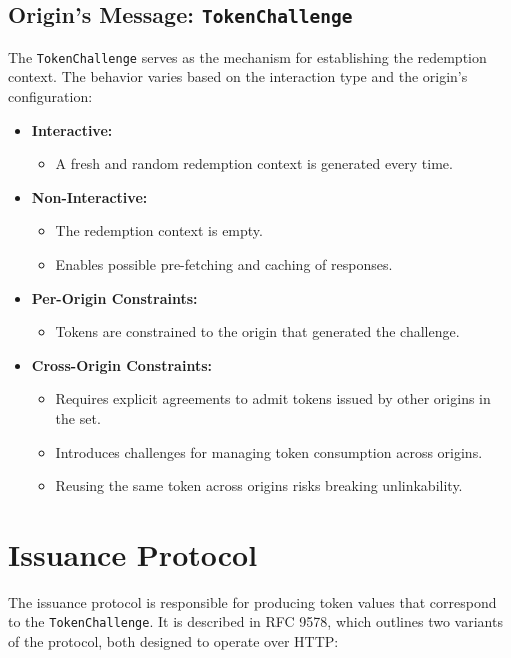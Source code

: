 \subsection{Origin's Message: \texttt{TokenChallenge}}

The \texttt{TokenChallenge} serves as the mechanism for establishing the redemption context. The behavior varies based on the interaction type and the origin's configuration:

\begin{itemize}
    \item \textbf{Interactive:}
    \begin{itemize}
        \item A fresh and random redemption context is generated every time.
    \end{itemize}
    
    \item \textbf{Non-Interactive:}
    \begin{itemize}
        \item The redemption context is empty.
        \item Enables possible pre-fetching and caching of responses.
    \end{itemize}
    
    \item \textbf{Per-Origin Constraints:}
    \begin{itemize}
        \item Tokens are constrained to the origin that generated the challenge.
    \end{itemize}
    
    \item \textbf{Cross-Origin Constraints:}
    \begin{itemize}
        \item Requires explicit agreements to admit tokens issued by other origins in the set.
        \item Introduces challenges for managing token consumption across origins.
        \item Reusing the same token across origins risks breaking unlinkability.
    \end{itemize}
\end{itemize}

\section{Issuance Protocol}

The issuance protocol is responsible for producing token values that correspond to the \texttt{TokenChallenge}. It is described in RFC 9578, which outlines two variants of the protocol, both designed to operate over HTTP:

